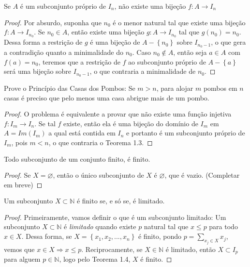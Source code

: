 \begin{theorem}
Se $A$ é um subconjunto próprio de $I_{n}$, não existe uma bijeção $f:A\rightarrow I_{n}$
\end{theorem}
\begin{proof}
Por absurdo, suponha que $n_{0}$ é o menor natural tal que existe uma bijeção $f:A \rightarrow I_{n_{0}}$.  Se $n_{0} \in A$, então existe uma bijeção $g:A \rightarrow I_{n_{0}}$ tal que $g(n_{0})=n_{0}$. Dessa forma a restrição de $g$ é uma bijeção de $A-\left \{ n_{0} \right \}$ sobre $I_{n_{0}-1}$, o que gera a contradição quanto a minimalidade do $n_{0}$. Caso $n_{0} \notin A$, então seja $a \in A$ com $f(a)=n_{0}$, teremos que a restrição de $f$ ao subconjunto próprio de $A-\left \{a \right \}$ será uma bijeção sobre $I_{n_{0}-1}$, o que contraria a minimalidade de $n_{0}$. 
\end{proof}

\begin{prob}
Prove o Princípio das Casas dos Pombos: Se $m>n$, para alojar $m$ pombos em $n$ casas é preciso que pelo menos uma casa abrigue mais de um pombo.
\end{prob}

\begin{proof}
O problema é equivalente a provar que não existe uma função injetiva $f: I_{m} \rightarrow I_{n}$. Se tal $f$ existe, então ela é uma bijeção do domínio de $I_{m}$ em $A=Im(I_{m})$ a qual está contida em $I_{n}$ e portanto é um subconjunto próprio de $I_{m}$, pois $m <n$, o que contraria o Teorema 1.3.
\end{proof}
\begin{theorem}
Todo subconjunto de um conjunto finito, é finito.
\end{theorem}

\begin{proof}
Se $X=\varnothing$, então o único subconjunto de $X$ é $\varnothing$, que é vazio.  (Completar em breve)
\end{proof}

\begin{corol}
Um subconjunto $X \subset \mathbb{N}$ é finito se, e só se, é limitado.
\end{corol}
\begin{proof}
Primeiramente, vamos definir o que é um subconjunto limitado: Um subconjunto $X \subset \mathbb{N}$ é \textit{limitado} quando existe $p$ natural tal que $x \leq p$ para todo $x \in X$. Dessa forma, se $X=\left \{ x_{1},x_{2},...,x_{n} \right \}$ é finito, pondo $p=\sum_{x_{j}\in X}^{}x_{j}$, vemos que $x\in X\Rightarrow x\leq p$. Reciprocamente, se $X \in \mathbb{N}$ é limitado, então $X \subset I_{p}$ para alguem $p \in \mathbb{N}$, logo pelo Teorema 1.4, $X$ é finito.
\end{proof}

